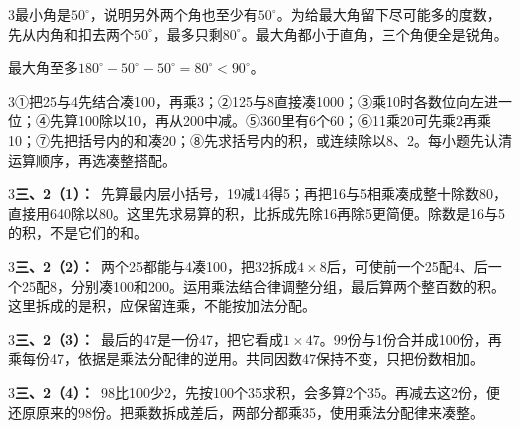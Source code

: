 \documentclass[multi=snippet,border={5bp 20bp 5bp 5bp}]{standalone}
\newenvironment{snippet}[3]{\begin{minipage}{#1bp}\color{answerred}\fontsize{#2}{#3}\selectfont\raggedright}{\end{minipage}}
\begin{document}
\begin{snippet}{505}{11.5}{14}\begin{multicols}{3}\raggedcolumns 最小角是\(50^\circ\)\allowbreak ，说明另外两个角也至少有\(50^\circ\)\allowbreak 。为给最大角留下尽可能多的度数，先从内角和扣去两个\(50^\circ\)\allowbreak ，最多只剩\(80^\circ\)\allowbreak 。最大角都小于直角，三个角便全是锐角。\par 最大角至多\(180^\circ-50^\circ-50^\circ=80^\circ<90^\circ\)\allowbreak 。\end{multicols}\end{snippet}
\begin{snippet}{505}{11.5}{14}\begin{multicols}{3}\raggedcolumns ①把25与4先结合凑100，再乘3；②125与8直接凑1000；③乘10时各数位向左进一位；④先算100除以10，再从200中减。⑤360里有6个60；⑥11乘20可先乘2再乘10；⑦先把括号内的和凑20；⑧先求括号内的积，或连续除以8、2。每小题先认清运算顺序，再选凑整搭配。\end{multicols}\end{snippet}
\begin{snippet}{505}{11.5}{14}\begin{multicols}{3}\raggedcolumns \textbf{三、2（1）：}\ 先算最内层小括号，19减14得5；再把16与5相乘凑成整十除数80，直接用640除以80。这里先求易算的积，比拆成先除16再除5更简便。除数是16与5的积，不是它们的和。\end{multicols}\end{snippet}
\begin{snippet}{505}{11.5}{14}\begin{multicols}{3}\raggedcolumns \textbf{三、2（2）：}\ 两个25都能与4凑100，把32拆成\(4\times8\)\allowbreak 后，可使前一个25配4、后一个25配8，分别凑100和200。运用乘法结合律调整分组，最后算两个整百数的积。这里拆成的是积，应保留连乘，不能按加法分配。\end{multicols}\end{snippet}
\begin{snippet}{505}{11.5}{14}\begin{multicols}{3}\raggedcolumns \textbf{三、2（3）：}\ 最后的47是一份47，把它看成\(1\times47\)\allowbreak 。99份与1份合并成100份，再乘每份47，依据是乘法分配律的逆用。共同因数47保持不变，只把份数相加。\end{multicols}\end{snippet}
\begin{snippet}{505}{11.5}{14}\begin{multicols}{3}\raggedcolumns \textbf{三、2（4）：}\ 98比100少2，先按100个35求积，会多算2个35。再减去这2份，便还原原来的98份。把乘数拆成差后，两部分都乘35，使用乘法分配律来凑整。\end{multicols}\end{snippet}
\end{document}
